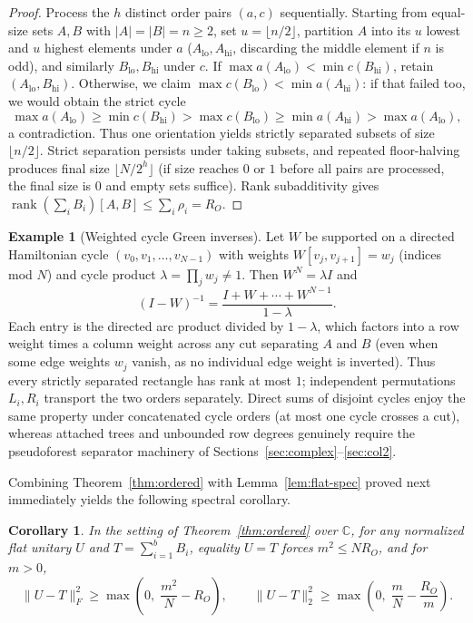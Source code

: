 \documentclass[11pt,reqno]{amsart}
\numberwithin{equation}{section}
\newtheorem{corollary}[theorem]{Corollary}
\theoremstyle{definition}
\newtheorem{example}[theorem]{Example}
\theoremstyle{remark}
\newcommand{\C}{\mathbb{C}}
\newcommand{\rank}{\operatorname{rank}}
\begin{document}
\begin{proof}
Process the $h$ distinct order pairs $(a,c)$ sequentially. Starting from equal-size sets $A,B$ with $|A|=|B|=n\ge 2$, set $u=\lfloor n/2\rfloor$, partition $A$ into its $u$ lowest and $u$ highest elements under $a$ ($A_{\mathrm{lo}}, A_{\mathrm{hi}}$, discarding the middle element if $n$ is odd), and similarly $B_{\mathrm{lo}},B_{\mathrm{hi}}$ under $c$. If $\max a(A_{\mathrm{lo}}) < \min c(B_{\mathrm{hi}})$, retain $(A_{\mathrm{lo}}, B_{\mathrm{hi}})$. Otherwise, we claim $\max c(B_{\mathrm{lo}}) < \min a(A_{\mathrm{hi}})$: if that failed too, we would obtain the strict cycle
\[
\max a(A_{\mathrm{lo}}) \ge \min c(B_{\mathrm{hi}}) > \max c(B_{\mathrm{lo}}) \ge \min a(A_{\mathrm{hi}}) > \max a(A_{\mathrm{lo}}),
\]
a contradiction. Thus one orientation yields strictly separated subsets of size $\lfloor n/2\rfloor$. Strict separation persists under taking subsets, and repeated floor-halving produces final size $\lfloor N/2^h\rfloor$ (if size reaches $0$ or $1$ before all pairs are processed, the final size is $0$ and empty sets suffice). Rank subadditivity gives $\rank(\sum_i B_i)[A,B]\le \sum_i \rho_i = R_O$.
\end{proof}

\begin{example}[Weighted cycle Green inverses]
Let $W$ be supported on a directed Hamiltonian cycle $(v_0,v_1,\ldots,v_{N-1})$ with weights $W[v_j,v_{j+1}]=w_j$ (indices mod $N$) and cycle product $\lambda=\prod_j w_j \neq 1$. Then $W^N = \lambda I$ and
\[
(I - W)^{-1} = \frac{I + W + \cdots + W^{N-1}}{1 - \lambda}.
\]
Each entry is the directed arc product divided by $1-\lambda$, which factors into a row weight times a column weight across any cut separating $A$ and $B$ (even when some edge weights $w_j$ vanish, as no individual edge weight is inverted). Thus every strictly separated rectangle has rank at most $1$; independent permutations $L_i,R_i$ transport the two orders separately. Direct sums of disjoint cycles enjoy the same property under concatenated cycle orders (at most one cycle crosses a cut), whereas attached trees and unbounded row degrees genuinely require the pseudoforest separator machinery of Sections~\ref{sec:complex}--\ref{sec:col2}.
\end{example}

Combining Theorem~\ref{thm:ordered} with Lemma~\ref{lem:flat-spec} proved next immediately yields the following spectral corollary.

\begin{corollary}
\label{cor:ordered-spec}
In the setting of Theorem~\ref{thm:ordered} over $\C$, for any normalized flat unitary $U$ and $T = \sum_{i=1}^b B_i$, equality $U=T$ forces $m^2\le N R_O$, and for $m>0$,
\[
\|U - T\|_F^2 \ge \max\!\left(0,\; \frac{m^2}{N} - R_O\right),\qquad
\|U - T\|_2^2 \ge \max\!\left(0,\; \frac{m}{N} - \frac{R_O}{m}\right).
\]
\end{corollary}
\end{document}
